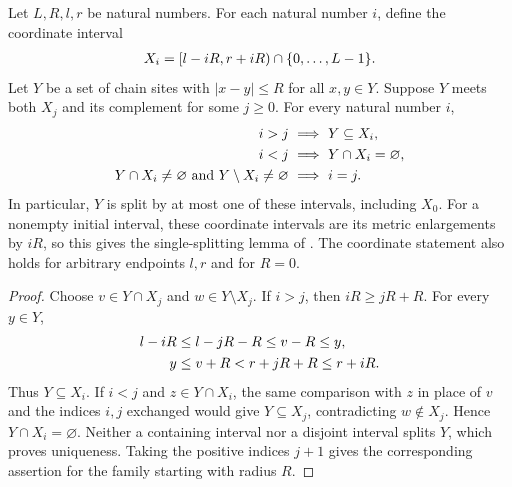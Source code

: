 \begin{lemma}
    \label{thm:chain_single_splitting}
    \leanok
    Let $L,R,l,r$ be natural numbers. For each natural number $i$, define
    the coordinate interval
    \begin{align}
        X_i=[l-iR,r+iR)\cap\{0,\ldots,L-1\}.\notag
    \end{align}
    Let $Y$ be a set of chain sites with $|x-y|\le R$ for all $x,y\in Y$.
    Suppose $Y$ meets both $X_j$ and its complement for some $j\ge0$.
    For every natural number $i$,
    \begin{align}
        i>j & \ \Longrightarrow\ Y\subseteq X_i,\notag        \\
        i<j & \ \Longrightarrow\ Y\cap X_i=\varnothing,\notag \\
        Y\cap X_i\ne\varnothing\ \text{and}\ Y\setminus X_i\ne\varnothing
            & \ \Longrightarrow\ i=j.\notag
    \end{align}
    In particular, $Y$ is split by at most one of these intervals, including
    $X_0$. For a nonempty initial interval, these coordinate intervals are
    its metric enlargements by $iR$, so this gives the single-splitting
    lemma of \cite[Part~I]{TNLean2026OneDimensional}. The coordinate
    statement also holds for arbitrary endpoints $l,r$ and for $R=0$.
    
\end{lemma}
\begin{proof}
    \leanok
    Choose $v\in Y\cap X_j$ and $w\in Y\setminus X_j$.
    If $i>j$, then $iR\ge jR+R$. For every $y\in Y$,
    \begin{align}
        l-iR & \le l-jR-R\le v-R\le y,\notag \\
        y    & \le v+R<r+jR+R\le r+iR.\notag
    \end{align}
    Thus $Y\subseteq X_i$. If $i<j$ and $z\in Y\cap X_i$, the same
    comparison with $z$ in place of $v$ and the indices $i,j$ exchanged
    would give $Y\subseteq X_j$, contradicting $w\notin X_j$.
    Hence $Y\cap X_i=\varnothing$. Neither a containing interval nor a
    disjoint interval splits $Y$, which proves uniqueness. Taking the
    positive indices $j+1$ gives the corresponding assertion for the
    family starting with radius $R$.
\end{proof}

